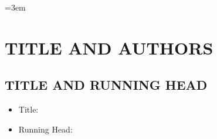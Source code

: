 \documentclass[12pt,english]{article}
\begin{document}
\emergencystretch=3em

\clearpage



\setcounter{page}{1}

\section*{TITLE AND AUTHORS}
\subsection*{TITLE AND RUNNING HEAD}
\begin{itemize}[label={}, leftmargin=*]
    \item Title: \textbf{\PAPERTITLE}
    \item Running Head:  \textbf{\PAPERRUNNINGHEAD}
\end{itemize}
\end{document}
